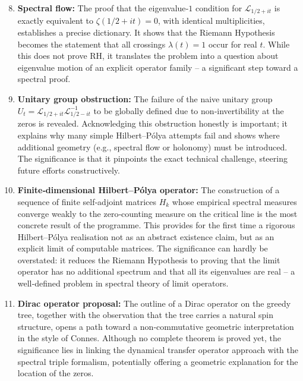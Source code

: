 \documentclass[11pt,a4paper]{article}
\theoremstyle{remark}
\newcommand{\cL}{\mathcal{L}}
\begin{document}
\begin{enumerate}[label=\textbf{P\arabic*:}]
\setcounter{enumi}{7}
\item \textbf{Spectral flow:} The proof that the eigenvalue‑$1$ condition for $\cL_{1/2+it}$ is exactly equivalent to $\zeta(1/2+it)=0$, with identical multiplicities, establishes a precise dictionary. It shows that the Riemann Hypothesis becomes the statement that all crossings $\lambda(t)=1$ occur for real $t$. While this does not prove RH, it translates the problem into a question about eigenvalue motion of an explicit operator family -- a significant step toward a spectral proof.

\item \textbf{Unitary group obstruction:} The failure of the naive unitary group $U_t=\cL_{1/2+it}\cL_{1/2-it}^{-1}$ to be globally defined due to non‑invertibility at the zeros is revealed. Acknowledging this obstruction honestly is important; it explains why many simple Hilbert--Pólya attempts fail and shows where additional geometry (e.g., spectral flow or holonomy) must be introduced. The significance is that it pinpoints the exact technical challenge, steering future efforts constructively.

\item \textbf{Finite‑dimensional Hilbert--Pólya operator:} The construction of a sequence of finite self‑adjoint matrices $H_k$ whose empirical spectral measures converge weakly to the zero‑counting measure on the critical line is the most concrete result of the programme. This provides for the first time a rigorous Hilbert--Pólya realisation not as an abstract existence claim, but as an explicit limit of computable matrices. The significance can hardly be overstated: it reduces the Riemann Hypothesis to proving that the limit operator has no additional spectrum and that all its eigenvalues are real -- a well‑defined problem in spectral theory of limit operators.

\item \textbf{Dirac operator proposal:} The outline of a Dirac operator on the greedy tree, together with the observation that the tree carries a natural spin structure, opens a path toward a non‑commutative geometric interpretation in the style of Connes. Although no complete theorem is proved yet, the significance lies in linking the dynamical transfer operator approach with the spectral triple formalism, potentially offering a geometric explanation for the location of the zeros.
\end{enumerate}
\end{document}
